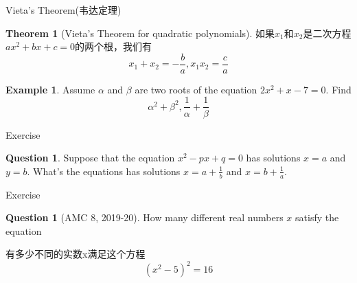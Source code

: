 \documentclass{beamer}
\theoremstyle{definition}
\newtheorem{theo}[defn]{Theorem}
\newtheorem{exam}[defn]{Example}
\newtheorem{ques}[defn]{Question}
\begin{document}
\begin{frame}{Vieta's Theorem(韦达定理)}
    \begin{theo}[Vieta's Theorem for quadratic polynomials]
        如果$x_1$和$x_2$是二次方程$ax^2+bx+c=0$的两个根，我们有
        \begin{equation*}
            x_1+x_2=-\frac{b}{a}, x_1x_2=\frac{c}{a}
        \end{equation*}
    \end{theo}
    \begin{exam}
        Assume $\alpha$ and $\beta$ are two roots of the equation $2x^2+x-7=0$. Find
        \begin{equation*}
            \alpha^2+\beta^2, \frac{1}{\alpha}+\frac{1}{\beta}
        \end{equation*}
    \end{exam}
\end{frame}
\begin{frame}{Exercise}
    \begin{ques}
        Suppose that the equation $x^2-px+q=0$ has solutions $x=a$ and $y=b$. What's the equations
        has solutions $x=a+\frac{1}{b}$ and $x=b+\frac{1}{a}$.
    \end{ques}
\end{frame}
\begin{frame}{Exercise}
    \begin{ques}[AMC 8, 2019-20]
        How many different real numbers $x$ satisfy the equation

        有多少不同的实数x满足这个方程
        \begin{equation*}
            (x^2-5)^2=16
        \end{equation*}
    \end{ques}
\end{frame}
\end{document}
